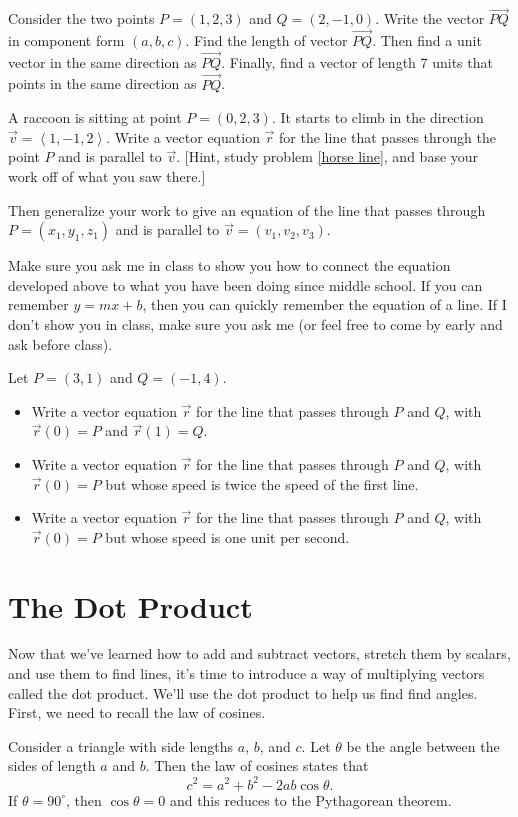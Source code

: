 \begin{problem}
Consider the two points $P=(1,2,3)$ and $Q=(2,-1,0)$. Write the vector $\vec {PQ}$ in component form $(a,b,c)$. Find the length of vector $\vec {PQ}$. Then find a unit vector in the same direction as $\vec{PQ}$. Finally, find a vector of length 7 units that points in the same direction as $\vec{PQ}$. 
\end{problem}


\begin{problem}
A raccoon is sitting at point $P=(0,2,3)$.  It starts to climb in the direction $\vec v=\left<1,-1,2\right>$.  
Write a vector equation $\vec r$ for the line that passes through the point $P$ and is parallel to $\vec v$. [Hint, study problem \ref{horse line}, and base your work off of what you saw there.]

Then generalize your work to give an equation of the line that passes through $P=(x_1,y_1,z_1)$ and is parallel to $\vec v=(v_1,v_2,v_3)$. 
\end{problem}

Make sure you ask me in class to show you how to connect the equation developed above to what you have been doing since middle school. If you can remember $y=mx+b$, then you can quickly remember the equation of a line.  If I don't show you in class, make sure you ask me (or feel free to come by early and ask before class).

\begin{problem}\label{first line between two points}%
Let $P=(3,1)$ and $Q=(-1,4)$.  
\begin{itemize}
\item Write a vector equation $\vec r$ for the line that passes through $P$ and $Q$, with $\vec r(0)=P$ and $\vec r(1)=Q$.
\item Write a vector equation $\vec r$ for the line that passes through $P$ and $Q$, with $\vec r(0)=P$ but whose speed is twice the speed of the first line.
\item Write a vector equation $\vec r$ for the line that passes through $P$ and $Q$, with $\vec r(0)=P$ but whose speed is one unit per second.
\end{itemize}
\end{problem}

\section{The Dot Product}
Now that we've learned how to add and subtract vectors, stretch them by scalars, and use them to find lines, it's time to introduce a way of multiplying vectors called the dot product.  We'll use the dot product to help us find find angles. First, we need to recall the law of cosines.
\begin{theorem*}
Consider a triangle with side lengths $a$, $b$, and $c$. Let $\theta$ be the angle between the sides of length $a$ and $b$. Then the law of cosines states that 
$$c^2=a^2+b^2-2ab\cos\theta.$$
If $\theta=90^\circ$, then $\cos\theta=0$ and this reduces to the Pythagorean theorem.
\end{theorem*}


